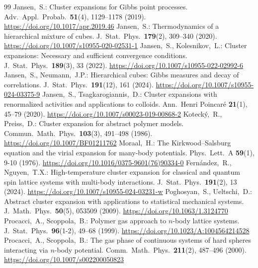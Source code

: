 \documentclass[10pt,a4paper]{amsart}
\begin{document}
\begin{thebibliography}{99}
 Jansen,~S.: Cluster expansions for Gibbs point processes. Adv.\ Appl.\ Probab.\ \textbf{51}(4), 1129–1178 (2019). \url{https://doi.org/10.1017/apr.2019.46}
 Jansen,~S.: Thermodynamics of a hierarchical mixture of cubes. J.\ Stat.\ Phys.\ \textbf{179}(2), 309–340 (2020). \url{https://doi.org/10.1007/s10955-020-02531-1}
 Jansen,~S., Kolesnikov,~L.: Cluster expansions: Necessary and sufficient convergence conditions. J.\ Stat.\ Phys.\ \textbf{189}(3), 33 (2022). \url{https://doi.org/10.1007/s10955-022-02992-6}
 Jansen,~S., Neumann,~J.P.: Hierarchical cubes: Gibbs measures and decay of correlations. J.\ Stat.\ Phys.\ \textbf{191}(12), 161 (2024). \url{https://doi.org/10.1007/s10955-024-03375-9}
 Jansen,~S., Tsagkarogiannis,~D.: Cluster expansions with renormalized activities and applications to colloids. Ann.\ Henri Poincar{\'e} \textbf{21}(1), 45–79 (2020). \url{https://doi.org/10.1007/s00023-019-00868-2}
 Koteck{\'y},~R., Preiss,~D.: Cluster expansion for abstract polymer models. Commun.\ Math.\ Phys.\ \textbf{103}(3), 491–498 (1986). \url{https://doi.org/10.1007/BF01211762}
 Moraal,~H.: The Kirkwood--Salsburg equation and the virial expansion for many-body potentials. Phys.\ Lett.\ A \textbf{59}(1), 9-10 (1976). \url{https://doi.org/10.1016/0375-9601(76)90334-0}
 Fern{\'a}ndez,~R., Nguyen,~T.X.: High-temperature cluster expansion for classical and quantum spin lattice systems with multi-body interactions. J.\ Stat.\ Phys.\ \textbf{191}(2), 13 (2024). \url{https://doi.org/10.1007/s10955-024-03231-w}
 Poghosyan,~S., Ueltschi,~D.: Abstract cluster expansion with applications to statistical mechanical systems. J.\ Math.\ Phys.\ \textbf{50}(5), 053509 (2009). \url{https://doi.org/10.1063/1.3124770}
 Procacci,~A., Scoppola,~B.: Polymer gas approach to $n$-body lattice systems. J.\ Stat.\ Phys.\ \textbf{96}(1-2), 49–68 (1999). \url{https://doi.org/10.1023/A:1004564214528}
 Procacci,~A., Scoppola,~B.: The gas phase of continuous systems of hard spheres interacting via $n$-body potential. Comm.\ Math.\ Phys.\ \textbf{211}(2), 487–496 (2000). \url{https://doi.org/10.1007/s002200050823}

\end{thebibliography}
\end{document}
